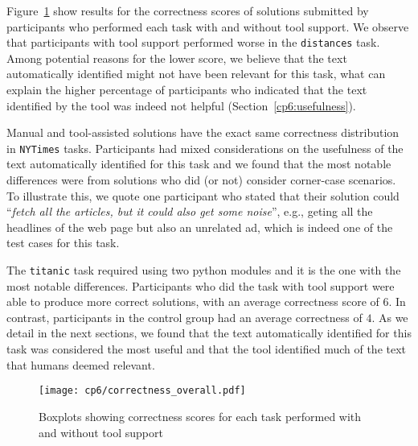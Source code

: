 Figure~\ref{fig:correctness-by-task}  
show results for the correctness scores of solutions submitted by participants
who performed each task with and without tool support. 
We observe that participants with tool support performed worse in the \texttt{distances} task. 
Among potential reasons for the lower score, we believe that the text automatically identified 
might not have been relevant for this task, what can explain the higher percentage of participants
who indicated that the text identified  by the tool was indeed not helpful (Section~\ref{cp6:usefulness}).



Manual and tool-assisted solutions have the exact same correctness distribution in \texttt{NYTimes} tasks.
Participants had mixed considerations on the usefulness of the text automatically identified for this task 
and we found that the most notable differences were from solutions who did (or not) consider corner-case scenarios.
To illustrate this, we quote one participant who stated that their solution could ``\textit{fetch all the articles, but it could also get some noise}'',
e.g., geting all the headlines of the web page but also an unrelated ad, which is indeed one of the test cases for this task. 



The \texttt{titanic} task required using two python modules and it is the one with the most notable differences. 
Participants who did the task with tool support were able to produce more correct solutions, with an average 
correctness score of $6$. In contrast, participants in the control group had an average correctness of $4$. 
As we detail in the next sections, we found that the text automatically identified for this task 
was considered the most useful and that the tool identified much of the text that humans deemed relevant. 





\begin{figure}
    \centering
    \texttt{[image: cp6/correctness\_overall.pdf]}
    \caption{Boxplots showing correctness scores for each task performed with and without tool support}
    \label{fig:correctness-by-task}
\end{figure}




